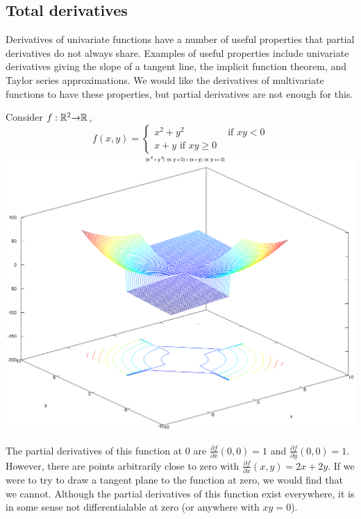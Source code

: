 \subsection{Total derivatives}

Derivatives of univariate functions have a number of useful properties
that partial derivatives do not always share. Examples of useful
properties include univariate derivatives giving the slope of a
tangent line, the implicit function theorem, and Taylor series
approximations. We would like the derivatives of multivariate
functions to have these properties, but partial derivatives are not
enough for this.

\begin{example}\label{ex:nondiff}
  Consider $f:\mathbb{R}^2 {\rightarrow} \mathbb{R}$, 
  \[ f(x,y) = \begin{cases} x^2+y^2 & \text{ if } xy < 0 \\
    x + y \text{ if } xy \geq 0 
  \end{cases}
  \]
  \includegraphics[width=\linewidth]{nondiff}
  
  The partial derivatives of this function at $0$ are $\frac{\partial
    f}{\partial x}(0,0) = 1$ and $\frac{\partial f}{\partial y}(0,0) =
  1$. However, there are points arbitrarily close to zero with
  $\frac{\partial f}{\partial x}(x,y) = 2x + 2y$. If we were to try to
  draw a tangent plane to the function at zero, we would find that we
  cannot. Although the partial derivatives of this function exist
  everywhere, it is in some sense not differentialable at zero (or
  anywhere with $xy = 0$).
\end{example}
